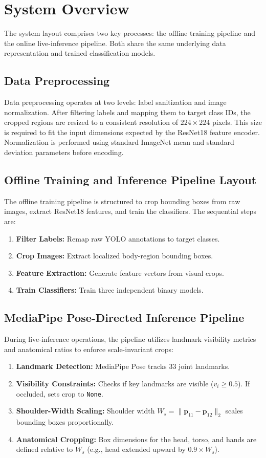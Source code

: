 \documentclass[11pt,a4paper]{article}
\begin{document}
\section{System Overview}
The system layout comprises two key processes: the offline training pipeline and the online live-inference pipeline. Both share the same underlying data representation and trained classification models.

\subsection{Data Preprocessing}
\label{sec:preprocessing}
Data preprocessing operates at two levels: label sanitization and image normalization. After filtering labels and mapping them to target class IDs, the cropped regions are resized to a consistent resolution of $224 \times 224$ pixels. This size is required to fit the input dimensions expected by the ResNet18 feature encoder. Normalization is performed using standard ImageNet mean and standard deviation parameters before encoding.

\subsection{Offline Training and Inference Pipeline Layout}
The offline training pipeline is structured to crop bounding boxes from raw images, extract ResNet18 features, and train the classifiers. The sequential steps are:
\begin{enumerate}
\item \textbf{Filter Labels:} Remap raw YOLO annotations to target classes.
\item \textbf{Crop Images:} Extract localized body-region bounding boxes.
\item \textbf{Feature Extraction:} Generate feature vectors from visual crops.
\item \textbf{Train Classifiers:} Train three independent binary models.
\end{enumerate}

\subsection{MediaPipe Pose-Directed Inference Pipeline}
During live-inference operations, the pipeline utilizes landmark visibility metrics and anatomical ratios to enforce scale-invariant crops:
\begin{enumerate}
\item \textbf{Landmark Detection:} MediaPipe Pose tracks 33 joint landmarks.
\item \textbf{Visibility Constraints:} Checks if key landmarks are visible ($v_i \ge 0.5$). If occluded, sets crop to \texttt{None}.
\item \textbf{Shoulder-Width Scaling:} Shoulder width $W_s = \| \mathbf{p}_{11} - \mathbf{p}_{12} \|_2$ scales bounding boxes proportionally.
\item \textbf{Anatomical Cropping:} Box dimensions for the head, torso, and hands are defined relative to $W_s$ (e.g., head extended upward by $0.9 \times W_s$).
\end{enumerate}
\end{document}
